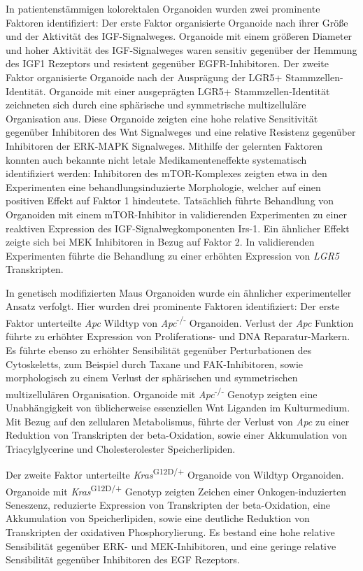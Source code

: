 In patientenstämmigen kolorektalen Organoiden wurden zwei prominente Faktoren identifiziert: Der erste Faktor organisierte Organoide nach ihrer Größe und der Aktivität des IGF-Signalweges. Organoide mit einem größeren Diameter und hoher Aktivität des IGF-Signalweges waren sensitiv gegenüber der Hemmung des IGF1 Rezeptors und resistent gegenüber EGFR-Inhibitoren. 
\smallbreak
Der zweite Faktor organisierte Organoide nach der Ausprägung der LGR5+ Stammzellen-Identität. Organoide mit einer ausgeprägten LGR5+ Stammzellen-Identität zeichneten sich durch eine sphärische und symmetrische multizelluläre Organisation aus. Diese Organoide zeigten eine hohe relative Sensitivität gegenüber Inhibitoren des Wnt Signalweges und eine relative Resistenz gegenüber Inhibitoren der ERK-MAPK Signalweges. 
\smallbreak
Mithilfe der gelernten Faktoren konnten auch bekannte nicht letale Medikamenteneffekte systematisch identifiziert werden: Inhibitoren des mTOR-Komplexes zeigten etwa in den Experimenten eine behandlungsinduzierte Morphologie, welcher auf einen positiven Effekt auf Faktor 1 hindeutete. Tatsächlich führte Behandlung von Organoiden mit einem mTOR-Inhibitor in validierenden Experimenten zu einer reaktiven Expression des IGF-Signalwegkomponenten Irs-1. Ein ähnlicher Effekt zeigte sich bei MEK Inhibitoren in Bezug auf Faktor 2. In validierenden Experimenten führte die Behandlung zu einer erhöhten Expression von \textit{LGR5} Transkripten.
\bigbreak

In genetisch modifizierten Maus Organoiden wurde ein ähnlicher experimenteller Ansatz verfolgt. Hier wurden drei prominente Faktoren identifiziert: Der erste Faktor unterteilte \textit{Apc} Wildtyp von \textit{Apc}\textsuperscript{-/-} Organoiden. Verlust der \textit{Apc} Funktion führte zu erhöhter Expression von Proliferations- und DNA Reparatur-Markern. Es führte ebenso zu erhöhter Sensibilität gegenüber Perturbationen des Cytoskeletts, zum Beispiel durch Taxane und FAK-Inhibitoren, sowie morphologisch zu einem Verlust der sphärischen und symmetrischen multizellulären Organisation. Organoide mit \textit{Apc}\textsuperscript{-/-} Genotyp zeigten eine Unabhängigkeit von üblicherweise essenziellen Wnt Liganden im Kulturmedium. Mit Bezug auf den zellularen Metabolismus, führte der Verlust von \textit{Apc} zu einer Reduktion von Transkripten der beta-Oxidation, sowie einer Akkumulation von Triacylglycerine und Cholesterolester Speicherlipiden.
\bigbreak

Der zweite Faktor unterteilte \textit{Kras}\textsuperscript{G12D/+} Organoide von Wildtyp Organoiden. Organoide mit \textit{Kras}\textsuperscript{G12D/+} Genotyp zeigten Zeichen einer Onkogen-induzierten Seneszenz, reduzierte  Expression von Transkripten der beta-Oxidation, eine Akkumulation von Speicherlipiden, sowie eine deutliche Reduktion von Transkripten der oxidativen Phosphorylierung. Es bestand eine hohe relative Sensibilität gegenüber ERK- und MEK-Inhibitoren, und eine geringe relative Sensibilität gegenüber Inhibitoren des EGF Rezeptors. 
\bigbreak

